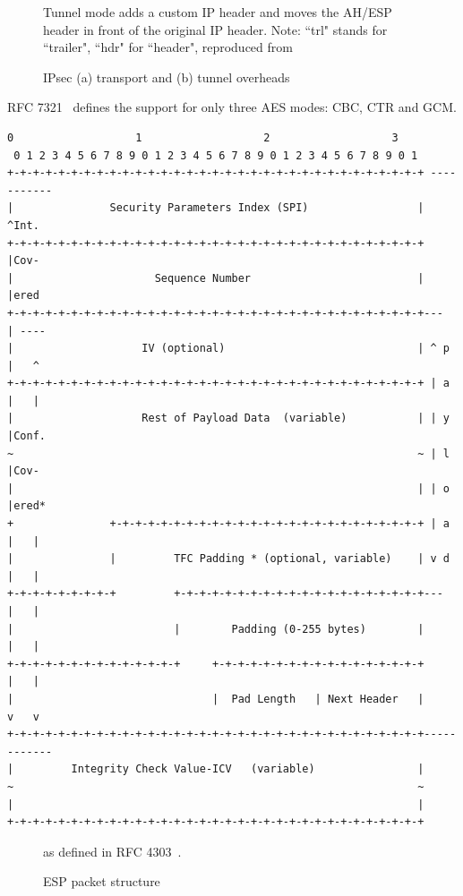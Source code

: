 \begin{figure}[ht]
\center
{}
\caption{IPsec (a) transport and (b) tunnel overheads}{Tunnel mode adds a custom IP header and moves the AH/ESP header in front of the original IP header. Note: ``trl" stands for ``trailer", ``hdr" for ``header", reproduced from~\cite{Xenakis20063225}}
\label{fig:ipsec-transport-tunnel}
\end{figure}

RFC 7321~\cite{rfc7321} defines the support for only three AES modes: CBC, CTR and GCM.





\newsavebox\myv

\begin{lrbox}{\myv}\begin{minipage}{\textwidth}
\begin{verbatim}
0                   1                   2                   3
 0 1 2 3 4 5 6 7 8 9 0 1 2 3 4 5 6 7 8 9 0 1 2 3 4 5 6 7 8 9 0 1
+-+-+-+-+-+-+-+-+-+-+-+-+-+-+-+-+-+-+-+-+-+-+-+-+-+-+-+-+-+-+-+-+ -----------
|               Security Parameters Index (SPI)                 |      ^Int.
+-+-+-+-+-+-+-+-+-+-+-+-+-+-+-+-+-+-+-+-+-+-+-+-+-+-+-+-+-+-+-+-+      |Cov-
|                      Sequence Number                          |      |ered
+-+-+-+-+-+-+-+-+-+-+-+-+-+-+-+-+-+-+-+-+-+-+-+-+-+-+-+-+-+-+-+-+---   | ----
|                    IV (optional)                              | ^ p  |   ^
+-+-+-+-+-+-+-+-+-+-+-+-+-+-+-+-+-+-+-+-+-+-+-+-+-+-+-+-+-+-+-+-+ | a  |   |
|                    Rest of Payload Data  (variable)           | | y  |Conf.
~                                                               ~ | l  |Cov-
|                                                               | | o  |ered*
+               +-+-+-+-+-+-+-+-+-+-+-+-+-+-+-+-+-+-+-+-+-+-+-+-+ | a  |   |
|               |         TFC Padding * (optional, variable)    | v d  |   |
+-+-+-+-+-+-+-+-+         +-+-+-+-+-+-+-+-+-+-+-+-+-+-+-+-+-+-+-+---   |   |
|                         |        Padding (0-255 bytes)        |      |   |
+-+-+-+-+-+-+-+-+-+-+-+-+-+     +-+-+-+-+-+-+-+-+-+-+-+-+-+-+-+-+      |   |
|                               |  Pad Length   | Next Header   |      v   v
+-+-+-+-+-+-+-+-+-+-+-+-+-+-+-+-+-+-+-+-+-+-+-+-+-+-+-+-+-+-+-+-+------------
|         Integrity Check Value-ICV   (variable)                |
~                                                               ~
|                                                               |
+-+-+-+-+-+-+-+-+-+-+-+-+-+-+-+-+-+-+-+-+-+-+-+-+-+-+-+-+-+-+-+-+
\end{verbatim}
\end{minipage}\end{lrbox}

\begin{figure}
\center
	\resizebox{.8\linewidth}{!}{%
	\usebox\myv
	}
\caption{ESP packet structure}{as defined in RFC 4303~\cite{rfc4303}.}
\label{fig:esp-packet-structure}
\end{figure}